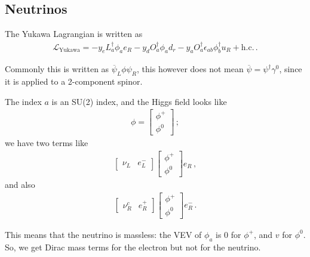 \documentclass[main.tex]{subfiles}
\begin{document}
\subsection{Neutrinos}

The Yukawa Lagrangian is written as 
%
\begin{align}
\mathscr{L}_{\text{Yukawa}}
= - y_{e} L ^\dag_{a} \phi_{a} e_{R}
-y_{d} O ^\dag_{a} \phi_{a} d_{r}
-y_{a} O ^\dag_{a} \epsilon_{ab} \phi ^\dag_{b} u_{R} 
+ \text{h.c.}
\,.
\end{align}

Commonly this is written as \(\overline{\psi}_{L} \phi \psi_{R}\), this however does not mean \(\overline{\psi} = \psi ^\dag \gamma^{0}\), since it is applied to a 2-component spinor. 

The index \(a\) is an SU(2) index, and the Higgs field looks like 
%
\begin{subequations}
\begin{align}
\phi = \left[\begin{array}{c}
\phi^{+} \\ 
\phi^{0}
\end{array}\right]
\,;
\end{align}
\end{subequations}
%
we have two terms like 
%
\begin{subequations}
\begin{align}
\left[\begin{array}{cc}
\nu_{L} & e^{-}_{L}
\end{array}\right]
\left[\begin{array}{c}
\phi^{+} \\ 
\phi^{0}
\end{array}\right]
e_{R}
\,,
\end{align}
\end{subequations}
%
and also 
%
\begin{subequations}
\begin{align}
\left[\begin{array}{cc}
\nu_{R}^{c} & e^{+}_{R}
\end{array}\right]
\left[\begin{array}{c}
\phi^{+} \\ 
\phi^{0}
\end{array}\right]
e_{R}^{-}
\,.
\end{align}
\end{subequations}

This means that the neutrino is massless: the VEV of \(\phi_{a}\) is 0 for \(\phi^{+}\), and \(v\) for \(\phi^{0}\). 
So, we get Dirac mass terms for the electron but not for the neutrino.
\end{document}
